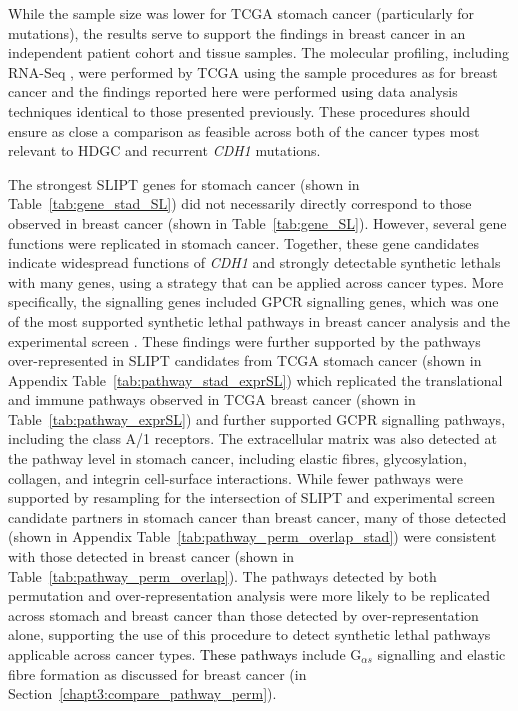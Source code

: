 While the sample size was lower for \gls{TCGA} stomach cancer (particularly for \glspl{mutation}), the results serve to support the findings in breast cancer in an independent patient cohort and tissue samples. The molecular profiling, including \gls{RNA-Seq} , were performed by \gls{TCGA} using the sample procedures as for breast cancer and the findings reported here were performed \textcolor{black}{using} data analysis techniques identical to those presented previously. These procedures should ensure as close a comparison as feasible across both of the cancer types most relevant to \gls{HDGC} and recurrent \textit{CDH1} \glspl{mutation}.

The strongest \gls{SLIPT} genes for stomach cancer (shown in Table~\ref{tab:gene_stad_SL}) did not necessarily directly correspond to those observed in breast cancer (shown in Table~\ref{tab:gene_SL}). However, several gene functions were replicated in stomach cancer. Together, these gene candidates indicate widespread functions of \textit{CDH1} and strongly detectable \glspl{synthetic lethal} with many genes, using a strategy that can be applied across cancer types. More specifically, the signalling genes included \gls{GPCR} signalling genes, which was one of the most supported \gls{synthetic lethal} \glspl{pathway} in breast cancer analysis and the experimental screen \citep{Telford2015}. %
These findings were further supported by the \glspl{pathway} over-represented in \gls{SLIPT} candidates from \gls{TCGA} stomach cancer (shown in Appendix Table~\ref{tab:pathway_stad_exprSL}) which replicated the translational and immune \glspl{pathway} observed in \gls{TCGA} breast cancer (shown in Table~\ref{tab:pathway_exprSL}) and further supported GCPR signalling \glspl{pathway}, including the class A/1 receptors. The extracellular matrix was also detected at the \gls{pathway} level in stomach cancer, including elastic fibres, glycosylation, collagen, and integrin cell-surface interactions. 
While fewer \glspl{pathway} were supported by resampling for the intersection of \gls{SLIPT} and experimental screen candidate partners in stomach cancer than breast cancer, many of those detected (shown in Appendix Table~\ref{tab:pathway_perm_overlap_stad}) were consistent with those detected in breast cancer (shown in Table~\ref{tab:pathway_perm_overlap}). The \glspl{pathway} detected by both permutation and over-representation analysis were more likely to be replicated across stomach and breast cancer than those detected by over-representation alone, supporting the use of this procedure to detect \gls{synthetic lethal} \glspl{pathway} applicable across cancer types. \textcolor{black}{These pathways} include G$_{\alpha s}$ signalling and elastic fibre formation as discussed for breast cancer (in Section~\ref{chapt3:compare_pathway_perm}).


